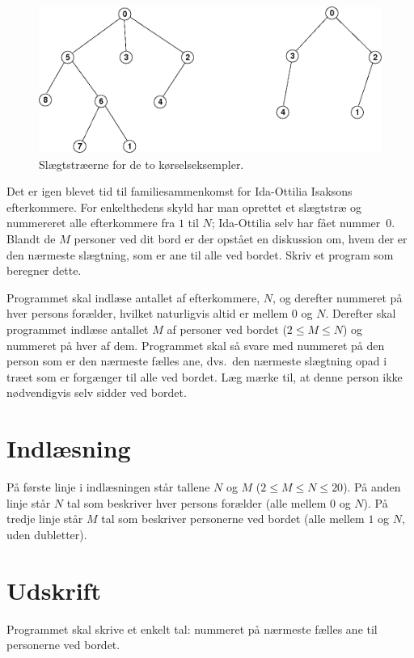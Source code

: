 \begin{figure}[h!]
  \centering
  \includegraphics[width=16cm]{slakttraffen.png}
  \caption{Slægtstræerne for de to kørselseksempler.}
\end{figure}

Det er igen blevet tid til familiesammenkomst for Ida-Ottilia Isaksons efterkommere.
For enkelthedens skyld har man oprettet et slægtstræ og nummereret alle efterkommere fra $1$ til $N$; Ida-Ottilia selv har fået nummer~$0$.
Blandt de $M$ personer ved dit bord er der opstået en diskussion om, hvem der er den nærmeste slægtning, som er ane til alle ved bordet.
Skriv et program som beregner dette.

Programmet skal indlæse antallet af efterkommere, $N$, og derefter nummeret på hver persons forælder, hvilket naturligvis altid er mellem $0$ og $N$.
Derefter skal programmet indlæse antallet $M$ af personer ved bordet ($2 \le M \le N$) og nummeret på hver af dem.
Programmet skal så svare med nummeret på den person som er den nærmeste fælles ane, dvs.\ den nærmeste slægtning opad i træet som er forgænger til alle ved bordet.
Læg mærke til, at denne person ikke nødvendigvis selv sidder ved bordet.

\section*{Indlæsning}
På første linje i indlæsningen står tallene $N$ og $M$ ($2 \le M \le N \le 20$).
På anden linje står $N$ tal som beskriver hver persons forælder (alle mellem $0$ og $N$).
På tredje linje står $M$ tal som beskriver personerne ved bordet (alle mellem $1$ og $N$, uden dubletter).

\section*{Udskrift}
Programmet skal skrive et enkelt tal: nummeret på nærmeste fælles ane til personerne ved bordet.
